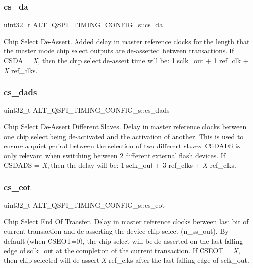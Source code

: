 \subsubsection{\texorpdfstring{cs\_da}{cs\_da}}
{\footnotesize\ttfamily uint32\+\_\+t A\+L\+T\+\_\+\+Q\+S\+P\+I\+\_\+\+T\+I\+M\+I\+N\+G\+\_\+\+C\+O\+N\+F\+I\+G\+\_\+s\+::cs\+\_\+da}

Chip Select De-\/\+Assert. Added delay in master reference clocks for the length that the master mode chip select outputs are de-\/asserted between transactions. If C\+S\+DA = {\itshape X}, then the chip select de-\/assert time will be\+: 1 sclk\+\_\+out + 1 ref\+\_\+clk + {\itshape X} ref\+\_\+clks. \mbox{\label{structALT__QSPI__TIMING__CONFIG__s_a816a46360c8694d834ab1288c25465b2}} 
\subsubsection{\texorpdfstring{cs\_dads}{cs\_dads}}
{\footnotesize\ttfamily uint32\+\_\+t A\+L\+T\+\_\+\+Q\+S\+P\+I\+\_\+\+T\+I\+M\+I\+N\+G\+\_\+\+C\+O\+N\+F\+I\+G\+\_\+s\+::cs\+\_\+dads}

Chip Select De-\/\+Assert Different Slaves. Delay in master reference clocks between one chip select being de-\/activated and the activation of another. This is used to ensure a quiet period between the selection of two different slaves. C\+S\+D\+A\+DS is only relevant when switching between 2 different external flash devices. If C\+S\+D\+A\+DS = {\itshape X}, then the delay will be\+: 1 sclk\+\_\+out + 3 ref\+\_\+clks + {\itshape X} ref\+\_\+clks. \mbox{\label{structALT__QSPI__TIMING__CONFIG__s_af0edba2ff209199221fcb9ad6c371a06}} 
\subsubsection{\texorpdfstring{cs\_eot}{cs\_eot}}
{\footnotesize\ttfamily uint32\+\_\+t A\+L\+T\+\_\+\+Q\+S\+P\+I\+\_\+\+T\+I\+M\+I\+N\+G\+\_\+\+C\+O\+N\+F\+I\+G\+\_\+s\+::cs\+\_\+eot}

Chip Select End Of Transfer. Delay in master reference clocks between last bit of current transaction and de-\/asserting the device chip select (n\+\_\+ss\+\_\+out). By default (when C\+S\+E\+OT=0), the chip select will be de-\/asserted on the last falling edge of sclk\+\_\+out at the completion of the current transaction. If C\+S\+E\+OT = {\itshape X}, then chip selected will de-\/assert {\itshape X} ref\+\_\+clks after the last falling edge of sclk\+\_\+out. \mbox{\label{structALT__QSPI__TIMING__CONFIG__s_a881c932e9d97f4b3da676cc99ccbcc3a}} 
